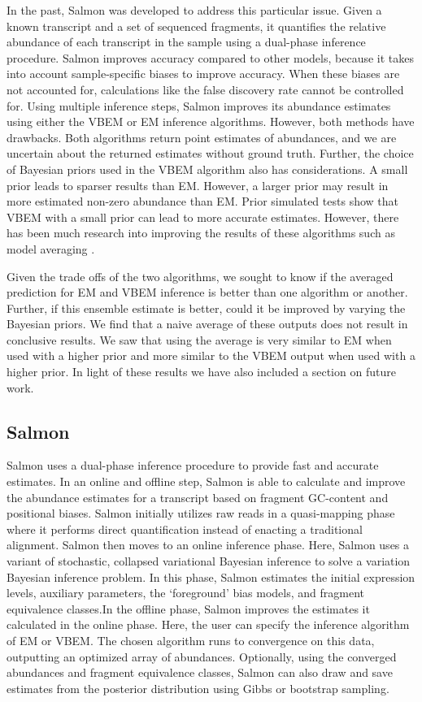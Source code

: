 In the past, Salmon was developed to address this particular issue. Given a known transcript and a set of sequenced fragments, 
it quantifies the relative abundance of each transcript in the sample using a dual-phase inference procedure. 
Salmon improves accuracy compared to other models, because it takes into account sample-specific biases to improve accuracy. 
When these biases are not accounted for, calculations like the false discovery rate cannot be controlled for. 
Using multiple inference steps, Salmon improves its abundance estimates using either the VBEM or EM inference algorithms. 
However, both methods have drawbacks. Both algorithms return point estimates of abundances, and we are uncertain about the returned 
estimates without ground truth. Further, the choice of  Bayesian priors used in the VBEM algorithm also has considerations. 
A small prior leads to sparser results than EM. However, a larger prior may result in more estimated non-zero abundance than EM. 
Prior simulated tests \cite{noauthor_salmon_nodate} show that VBEM with a small prior can lead to more accurate estimates. However, 
there has been much research into improving the results of these algorithms such as model averaging \cite{hoeting_bayesian_1999}. 

Given the trade offs of the two algorithms, we sought to know if the averaged prediction for EM and VBEM inference is better than 
one algorithm or another. Further, if this ensemble estimate is better, could it be improved by varying the Bayesian priors.
We find that a naive average of these outputs does not result in conclusive results. We saw that using the average is very similar to EM when used with a higher prior and more similar to the VBEM output when used with 
a higher prior. In light of these results we have also included a section on future work. 

\subsection{Salmon}
Salmon uses a dual-phase inference procedure to provide fast and accurate estimates. 
In an online and offline step, Salmon is able to calculate and improve the abundance 
estimates for a transcript based on fragment GC-content and positional biases. 
Salmon initially utilizes raw reads in a quasi-mapping phase where it performs direct 
quantification instead of enacting a traditional alignment. 
Salmon then moves to an online inference phase. 
Here, Salmon uses a variant of stochastic, collapsed variational Bayesian inference to solve 
a variation Bayesian inference problem. 
In this phase, Salmon estimates the initial expression levels, auxiliary parameters, 
the ‘foreground’ bias models, and fragment equivalence classes.In the offline phase, 
Salmon improves the estimates it calculated in the online phase. Here, the user can 
specify the inference algorithm of EM or VBEM. The chosen algorithm runs to convergence 
on this data, outputting an optimized array of abundances. 
Optionally, using the converged abundances and fragment equivalence classes, 
Salmon can also draw and save estimates from the posterior distribution using Gibbs or bootstrap sampling. 
